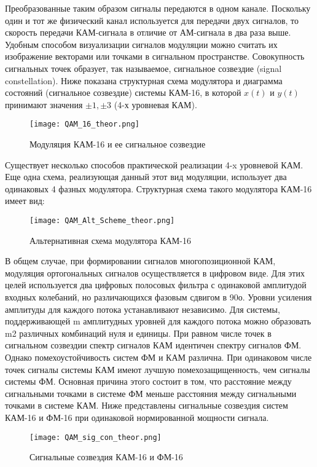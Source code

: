 Преобразованные таким образом сигналы передаются в одном канале. Поскольку один и тот же физический канал используется для передачи двух сигналов, то скорость передачи КАМ-сигнала в отличие от АМ-сигнала в два раза выше.
Удобным способом визуализации сигналов модуляции можно считать их изображение векторами или точками в сигнальном пространстве. Совокупность сигнальных точек образует, так называемое, сигнальное созвездие (signal constellation).
Ниже показана структурная схема модулятора и диаграмма состояний (сигнальное созвездие) системы КАМ-16, в которой $x(t)$ и $y(t)$ принимают значения $\pm 1, \pm 3$ (4-х уровневая КАМ). 
\begin{figure}[H]
	\begin{center}
		\texttt{[image: QAM\_16\_theor.png]}
		\caption{Модуляция КАМ-16 и ее сигнальное созвездие} %
		\label{QAM_16_theor} %
	\end{center}
\end{figure} 

Существует несколько способов практической реализации 4-x уровневой КАМ. Еще одна схема, реализующая данный этот вид модуляции, использует два одинаковых 4 фазных модулятора. Структурная схема такого модулятора КАМ-16 имеет вид:
\begin{figure}[H]
	\begin{center}
		\texttt{[image: QAM\_Alt\_Scheme\_theor.png]}
		\caption{Альтернативная схема модулятора КАМ-16} %
		\label{QAM_Alt_Scheme_theor} %
	\end{center}
\end{figure} 

В общем случае, при формировании сигналов многопозиционной КАМ, модуляция ортогональных сигналов осуществляется в цифровом виде. Для этих целей используется два цифровых полосовых фильтра с одинаковой амплитудой входных колебаний, но различающихся фазовым сдвигом в 90о. Уровни усиления амплитуды для каждого потока устанавливают независимо. Для системы, поддерживающей m амплитудных уровней для каждого потока можно образовать m2 различных комбинаций нуля и единицы.
При равном числе точек в сигнальном созвездии спектр сигналов КАМ идентичен спектру сигналов ФМ. Однако помехоустойчивость систем ФМ и КАМ различна. При одинаковом числе точек сигналы системы КАМ имеют лучшую помехозащищенность, чем сигналы системы ФМ. Основная причина этого состоит в том, что расстояние между сигнальными точками в системе ФМ меньше расстояния между сигнальными точками в системе КАМ. Ниже представлены сигнальные созвездия систем КАМ-16 и ФМ-16 при одинаковой нормированной мощности сигнала.
\begin{figure}[H]
	\begin{center}
		\texttt{[image: QAM\_sig\_con\_theor.png]}
		\caption{Сигнальные созвездия КАМ-16 и ФМ-16} %
		\label{QAM_sig_con_theor} %
	\end{center}
\end{figure} 

